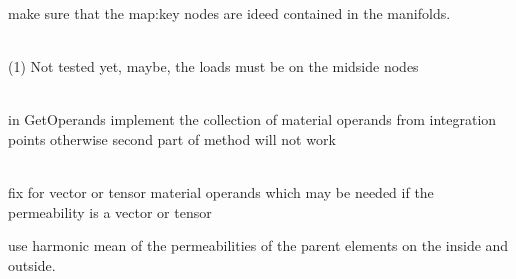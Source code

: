 \begin{DoxyRefList}
\label{todo__todo000175}%
%
make sure that the map\+:key nodes are ideed contained in the manifolds.  
\item[Member \doxylink{classcsmp_1_1_n_t__op_a00dd2359d7e8f608405dcfc66accd6a0}{csmp\+::NT\+\_\+op\texorpdfstring{$<$}{<} dim, CELL \texorpdfstring{$>$}{>}\+::Compute\+Contribution} (const CELL$<$ dim $>$ \&) override final]\hfill \\
\label{todo__todo000109}%
%
(1) Not tested yet, maybe, the loads must be on the midside nodes  
\item[Member \doxylink{classcsmp_1_1_num_integral__d_n_t__op__d_n__d_v___inter_face_a034f745778aebcee8b33cb2a2918c59f}{csmp\+::Num\+Integral\+\_\+d\+NT\+\_\+op\+\_\+d\+N\+\_\+d\+V\+\_\+\+Inter\+Face\texorpdfstring{$<$}{<} dim \texorpdfstring{$>$}{>}\+::Compute\+Contribution} (const \doxylink{classcsmp_1_1_inter_face}{Inter\+Face$<$ dim $>$} \&) override final]\hfill \\
\label{todo__todo000112}%
%
in Get\+Operands implement the collection of material operands from integration points otherwise second part of method will not work  
\item[Member \doxylink{classcsmp_1_1_num_integral__d_n_t__op__d_n__d_v___inter_face_a10e31061481fe1fb518d3beb3a6ba4bb}{csmp\+::Num\+Integral\+\_\+d\+NT\+\_\+op\+\_\+d\+N\+\_\+d\+V\+\_\+\+Inter\+Face\texorpdfstring{$<$}{<} dim \texorpdfstring{$>$}{>}\+::Get\+Operands} (const \doxylink{classcsmp_1_1_inter_face}{Inter\+Face$<$ dim $>$} \&) override final]\hfill \\
\label{todo__todo000110}%
%
fix for vector or tensor material operands which may be needed if the permeability is a vector or tensor 



use harmonic mean of the permeabilities of the parent elements on the inside and outside. 




\end{DoxyRefList}
